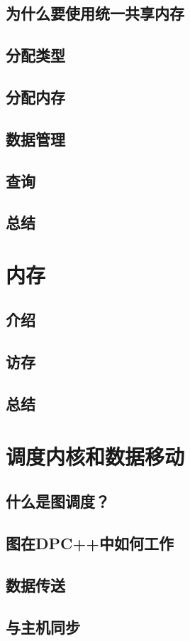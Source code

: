 \documentclass[11pt,a4paper,UTF8]{ctexart}
\begin{document}
		\subsection{为什么要使用统一共享内存}
		\subsection{分配类型}
		\subsection{分配内存}
		\subsection{数据管理}
		\subsection{查询}
		\subsection{总结}
	\section{内存}
		\subsection{介绍}
		\subsection{访存}
		\subsection{总结}
	\section{调度内核和数据移动}
		\subsection{什么是图调度？}
		\subsection{图在DPC++中如何工作}
		\subsection{数据传送}
		\subsection{与主机同步}
\end{document}
